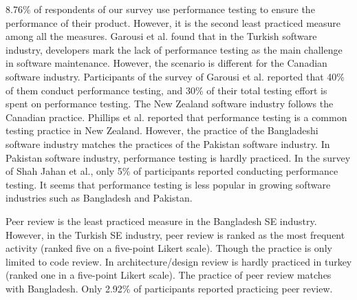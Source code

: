 8.76\% of respondents of our survey use performance testing to ensure the performance of their product. However, it is the second least practiced measure among all the measures. Garousi et al.\cite{Garousi2015} found that in the Turkish software industry, developers mark the lack of performance testing as the main challenge in software maintenance. However, the scenario is different for the Canadian software industry. Participants of the survey of Garousi et al.\cite{Garousi2013} reported that 40\% of them conduct performance testing, and 30\% of their total testing effort is spent on performance testing. The New Zealand software industry follows the Canadian practice. Phillips et al.\cite{Phillips2003} reported that performance testing is a common testing practice in New Zealand. However, the practice of the Bangladeshi software industry matches the practices of the Pakistan software industry. In Pakistan software industry, performance testing is hardly practiced. In the survey of Shah Jahan et al.\cite{Jahan2019}, only 5\% of participants reported conducting performance testing. It seems that performance testing is less popular in growing software industries such as Bangladesh and Pakistan.

Peer review is the least practiced measure in the Bangladesh SE industry. However, in the Turkish SE industry, peer review is ranked as the most frequent activity\cite{Garousi2015} (ranked five on a five-point Likert scale). Though the practice is only limited to code review. In architecture/design review is  hardly practiced in turkey (ranked one in a five-point Likert scale). The practice of peer review matches with Bangladesh. Only 2.92\% of participants reported practicing peer review.

